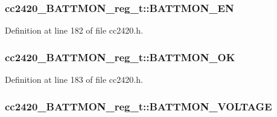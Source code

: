 \subsubsection[{\texorpdfstring{B\+A\+T\+T\+M\+O\+N\+\_\+\+EN}{BATTMON_EN}}]{ cc2420\+\_\+\+B\+A\+T\+T\+M\+O\+N\+\_\+reg\+\_\+t\+::\+B\+A\+T\+T\+M\+O\+N\+\_\+\+EN}\hypertarget{structcc2420___b_a_t_t_m_o_n__reg__t_aa37943b435159fa2d547f573edaa3862}{}\label{structcc2420___b_a_t_t_m_o_n__reg__t_aa37943b435159fa2d547f573edaa3862}


Definition at line 182 of file cc2420.\+h.

\subsubsection[{\texorpdfstring{B\+A\+T\+T\+M\+O\+N\+\_\+\+OK}{BATTMON_OK}}]{ cc2420\+\_\+\+B\+A\+T\+T\+M\+O\+N\+\_\+reg\+\_\+t\+::\+B\+A\+T\+T\+M\+O\+N\+\_\+\+OK}\hypertarget{structcc2420___b_a_t_t_m_o_n__reg__t_afe950a285302eeec12bff2e3d654e660}{}\label{structcc2420___b_a_t_t_m_o_n__reg__t_afe950a285302eeec12bff2e3d654e660}


Definition at line 183 of file cc2420.\+h.

\subsubsection[{\texorpdfstring{B\+A\+T\+T\+M\+O\+N\+\_\+\+V\+O\+L\+T\+A\+GE}{BATTMON_VOLTAGE}}]{ cc2420\+\_\+\+B\+A\+T\+T\+M\+O\+N\+\_\+reg\+\_\+t\+::\+B\+A\+T\+T\+M\+O\+N\+\_\+\+V\+O\+L\+T\+A\+GE}\hypertarget{structcc2420___b_a_t_t_m_o_n__reg__t_ae3ed1cbd8dd5259796efdbd9c1d86b53}{}\label{structcc2420___b_a_t_t_m_o_n__reg__t_ae3ed1cbd8dd5259796efdbd9c1d86b53}


